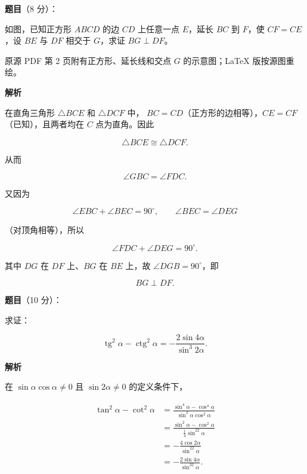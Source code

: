 \begin{answer}

\textbf{题目}（8 分）：

如图，已知正方形 $ABCD$ 的边 $CD$ 上任意一点 $E$，延长 $BC$ 到 $F$，使 $CF=CE$，设 $BE$ 与 $DF$ 相交于 $G$，求证 $BG\perp DF$。

\begin{gktip}
原源 PDF 第 2 页附有正方形、延长线和交点 $G$ 的示意图；LaTeX 版按源图重绘。
\end{gktip}
\nopagebreak[4]
\begin{center}\end{center}
\nopagebreak[4]
\textbf{解析}

在直角三角形 $\triangle BCE$ 和 $\triangle DCF$ 中，
$BC=CD$（正方形的边相等），$CE=CF$（已知），且两者均在 $C$ 点为直角。因此

\nopagebreak[4]
\[
\triangle BCE\cong\triangle DCF.
\]

从而

\nopagebreak[4]
\[
\angle GBC=\angle FDC.
\]

又因为

\nopagebreak[4]
\[
\angle EBC+\angle BEC=90^\circ,
\qquad
\angle BEC=\angle DEG
\]

（对顶角相等），所以

\nopagebreak[4]
\[
\angle FDC+\angle DEG=90^\circ.
\]

其中 $DG$ 在 $DF$ 上、$BG$ 在 $BE$ 上，故 $\angle DGB=90^\circ$，即

\nopagebreak[4]
\[
BG\perp DF.
\]


\end{answer}
\begin{answer}

\textbf{题目}（10 分）：

求证：

\nopagebreak[4]
\[
\operatorname{tg}^2\alpha-\operatorname{ctg}^2\alpha
=-\frac{2\sin4\alpha}{\sin^3 2\alpha}.
\]

\textbf{解析}

在 $\sin\alpha\cos\alpha\ne0$ 且 $\sin2\alpha\ne0$ 的定义条件下，

\nopagebreak[4]
\[
\begin{aligned}
\tan^2\alpha-\cot^2\alpha
&=\frac{\sin^4\alpha-\cos^4\alpha}
{\sin^2\alpha\cos^2\alpha}\\
&=\frac{\sin^2\alpha-\cos^2\alpha}
{\frac14\sin^22\alpha}\\
&=-\frac{4\cos2\alpha}{\sin^22\alpha}\\
&=-\frac{2\sin4\alpha}{\sin^32\alpha}.
\end{aligned}
\]


\end{answer}
